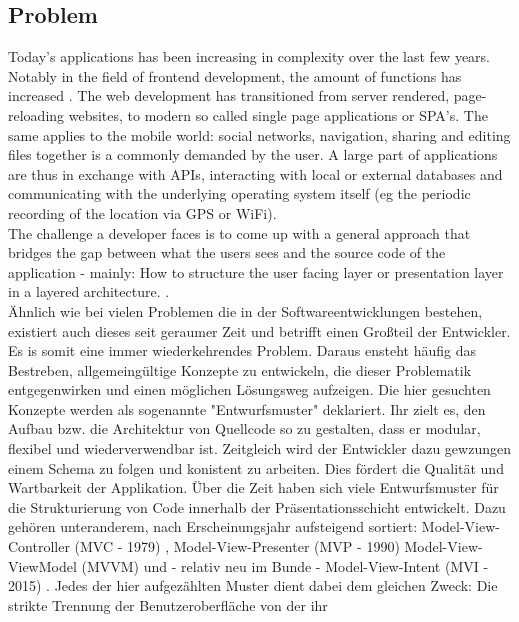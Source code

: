 \subsection{Problem}
\label{subsec:problem}

Today's applications has been increasing in complexity over the last few years.
Notably in the field of frontend development, the amount of functions has increased \cite{kevin2018}. The web development has transitioned from server rendered, 
page-reloading websites, to modern so called single page applications or SPA's.
The same applies to the mobile world: social networks, navigation, sharing and editing files together is a commonly demanded by the user.
A large part of applications are thus in exchange with APIs, interacting with local or external databases
and communicating with the underlying operating system itself (eg the periodic recording of the location via GPS or WiFi).
\\
The challenge a developer faces is to come up with a general approach that bridges the gap between what the users sees and the source code of 
the application - mainly: How to structure the user facing layer or presentation layer in a layered architecture. \cite{guru99ntier,softwareArchitecturePatternsMark2015}. \\
Ähnlich wie bei vielen Problemen die in der Softwareentwicklungen bestehen, existiert auch dieses seit geraumer Zeit und betrifft einen Großteil der Entwickler. 
Es is somit eine immer wiederkehrendes Problem. Daraus ensteht häufig das Bestreben, allgemeingültige Konzepte zu entwickeln, die dieser Problematik entgegenwirken 
und einen möglichen Lösungsweg aufzeigen. Die hier gesuchten Konzepte werden als sogenannte "Entwurfsmuster" \cite{techterms2016design-pattern} deklariert. Ihr zielt es, den Aufbau bzw. 
die Architektur von Quellcode so zu gestalten, dass er modular, flexibel und
wiederverwendbar ist. Zeitgleich wird der Entwickler dazu gewzungen einem Schema zu folgen und konistent zu arbeiten. Dies fördert die Qualität und
Wartbarkeit der Applikation. Über die Zeit haben sich viele Entwurfsmuster für die Strukturierung von Code innerhalb der Präsentationsschicht entwickelt. 
Dazu gehören unteranderem, nach Erscheinungsjahr aufsteigend sortiert: Model-View-Controller (MVC - 1979) \cite{wikipediaMvc}, 
Model-View-Presenter (MVP - 1990) \cite{wikipediaMvp} Model-View-ViewModel (MVVM) \cite{blogMsdnMvvm} und - relativ 
neu im Bunde - Model-View-Intent (MVI - 2015) \cite{youtubeAndreStaltzUserFunction}. Jedes der hier aufgezählten Muster dient dabei dem gleichen Zweck: Die strikte Trennung der Benutzeroberfläche von der ihr 
